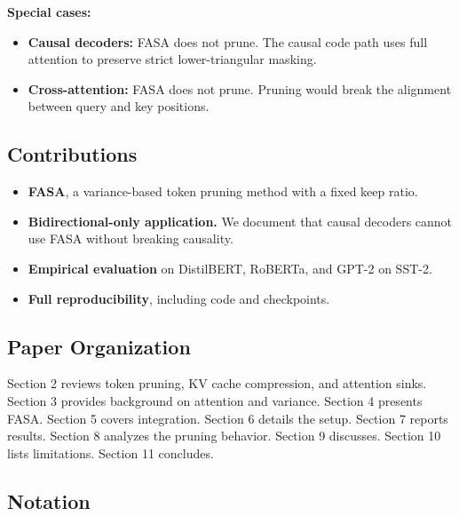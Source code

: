 \textbf{Special cases:}
\begin{itemize}
\item \textbf{Causal decoders:} FASA does not prune. The causal code path uses full
  attention to preserve strict lower-triangular masking.
\item \textbf{Cross-attention:} FASA does not prune. Pruning would break the
  alignment between query and key positions.

\end{itemize}
\subsection{Contributions}

\begin{itemize}
\item \textbf{FASA}, a variance-based token pruning method with a fixed keep ratio.
\item \textbf{Bidirectional-only application.} We document that causal decoders
  cannot use FASA without breaking causality.
\item \textbf{Empirical evaluation} on DistilBERT, RoBERTa, and GPT-2 on SST-2.
\item \textbf{Full reproducibility}, including code and checkpoints.

\end{itemize}
\subsection{Paper Organization}

Section 2 reviews token pruning, KV cache compression, and attention sinks. 
Section 3 provides background on attention and variance. Section 4 presents 
FASA. Section 5 covers integration. Section 6 details the setup. Section 7 
reports results. Section 8 analyzes the pruning behavior. Section 9 
discusses. Section 10 lists limitations. Section 11 concludes.



\subsection{Notation}

